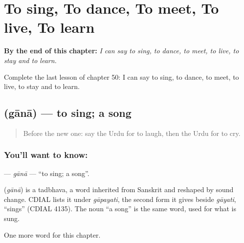 
\chapter{To sing, To dance, To meet, To live, To learn}
\label{ch:ur-to-sing-to-dance-to-meet-to-live-to-learn}

\begin{chapteropening}
\textbf{By the end of this chapter:} \emph{I can say to sing, to dance, to meet, to live, to stay and to learn.}

Complete the last lesson of chapter 50: I can say to sing, to dance, to meet, to live, to stay and to learn.
\end{chapteropening}

\section[\texorpdfstring{\ur{گانا} (gānā)}{گانا (gānā)}]{ (gānā) — to sing; a song}

\label{lesson:UR-C50-gana}



\begin{quote}
Before the new one: say the Urdu for to laugh, then the Urdu for to cry.
\end{quote}

\subsection*{You'll want to know: }
\textbf{} — \emph{gānā} — \textquotedblleft{}to sing; a song\textquotedblright{}.

\begin{cousinweb}
\textbf{} (\emph{gānā}) is a tadbhava, a word inherited from Sanskrit and reshaped by sound change. CDIAL lists it under \emph{gāpayati}, the second form it gives beside \emph{gāyati}, \textquotedblleft{}sings\textquotedblright{} (CDIAL 4135). The noun \textquotedblleft{}a song\textquotedblright{} is the same word, used for what is sung.
\end{cousinweb}

\begin{grammarlens}[title={What you've built}]
One more word for this chapter.
\end{grammarlens}

